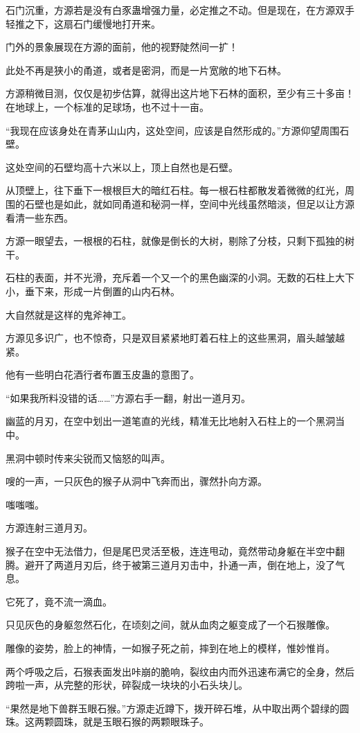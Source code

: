 \begin{this_body}
石门沉重，方源若是没有白豕蛊增强力量，必定推之不动。但是现在，在方源双手轻推之下，这扇石门缓慢地打开来。

门外的景象展现在方源的面前，他的视野陡然间一扩！

此处不再是狭小的甬道，或者是密洞，而是一片宽敞的地下石林。

方源稍微目测，仅仅是初步估算，就得出这片地下石林的面积，至少有三十多亩！在地球上，一个标准的足球场，也不过十一亩。

“我现在应该身处在青茅山山内，这处空间，应该是自然形成的。”方源仰望周围石壁。

这处空间的石壁均高十六米以上，顶上自然也是石壁。

从顶壁上，往下垂下一根根巨大的暗红石柱。每一根石柱都散发着微微的红光，周围的石壁也是如此，就如同甬道和秘洞一样，空间中光线虽然暗淡，但足以让方源看清一些东西。

方源一眼望去，一根根的石柱，就像是倒长的大树，剔除了分枝，只剩下孤独的树干。

石柱的表面，并不光滑，充斥着一个又一个的黑色幽深的小洞。无数的石柱上大下小，垂下来，形成一片倒置的山内石林。

大自然就是这样的鬼斧神工。

方源见多识广，也不惊奇，只是双目紧紧地盯着石柱上的这些黑洞，眉头越皱越紧。

他有一些明白花酒行者布置玉皮蛊的意图了。

“如果我所料没错的话……”方源右手一翻，射出一道月刃。

幽蓝的月刃，在空中划出一道笔直的光线，精准无比地射入石柱上的一个黑洞当中。

黑洞中顿时传来尖锐而又恼怒的叫声。

嗖的一声，一只灰色的猴子从洞中飞奔而出，骤然扑向方源。

嗤嗤嗤。

方源连射三道月刃。

猴子在空中无法借力，但是尾巴灵活至极，连连甩动，竟然带动身躯在半空中翻腾。避开了两道月刃后，终于被第三道月刃击中，扑通一声，倒在地上，没了气息。

它死了，竟不流一滴血。

只见灰色的身躯忽然石化，在顷刻之间，就从血肉之躯变成了一个石猴雕像。

雕像的姿势，脸上的神情，一如猴子死之前，摔到在地上的模样，惟妙惟肖。

两个呼吸之后，石猴表面发出咔崩的脆响，裂纹由内而外迅速布满它的全身，然后跨啦一声，从完整的形状，碎裂成一块块的小石头块儿。

“果然是地下兽群玉眼石猴。”方源走近蹲下，拨开碎石堆，从中取出两个碧绿的圆珠。这两颗圆珠，就是玉眼石猴的两颗眼珠子。


\end{this_body}
